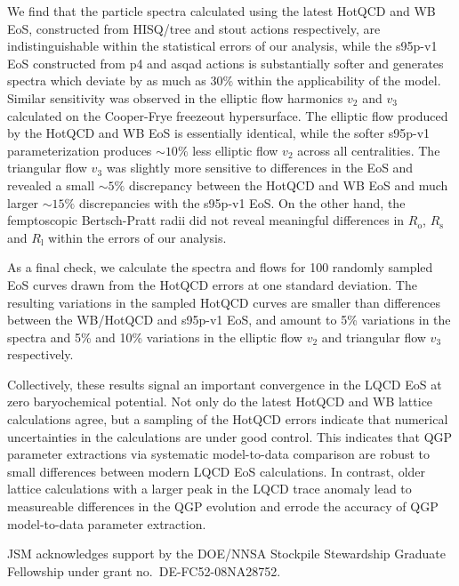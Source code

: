 \documentclass[aps,prc,reprint,amsmath,nofootinbib,superscriptaddress]{revtex4-1}
\begin{document}
We find that the particle spectra calculated using the latest HotQCD and WB EoS, constructed from HISQ/tree and stout actions respectively, are indistinguishable within the statistical errors of our analysis, while the s95p-v1 EoS constructed from p4 and asqad actions is substantially softer and generates spectra which deviate by as much as $30\%$ within the applicability of the model. 
Similar sensitivity was observed in the elliptic flow harmonics $v_2$ and $v_3$ calculated on the Cooper-Frye freezeout hypersurface. The elliptic flow produced by the HotQCD and WB EoS is essentially identical, while the softer s95p-v1 parameterization produces ${\sim}10\%$ less elliptic flow $v_2$ across all centralities. The triangular flow $v_3$ was slightly more sensitive to differences in the EoS and revealed a small ${\sim} 5\%$ discrepancy between the HotQCD and WB EoS and much larger ${\sim}15\%$ discrepancies with the s95p-v1 EoS. 
On the other hand, the femptoscopic Bertsch-Pratt radii did not reveal meaningful differences in $R_\text{o}$, $R_\text{s}$ and $R_\text{l}$ within the errors of our analysis. 

As a final check, we calculate the spectra and flows for 100 randomly sampled EoS curves drawn from the HotQCD errors at one standard deviation. The resulting variations in the sampled HotQCD curves are smaller than differences between the WB/HotQCD and s95p-v1 EoS, and amount to 
5\% variations in the spectra and 5\% and 10\% variations in the elliptic flow $v_2$ and triangular flow $v_3$ respectively. 

Collectively, these results signal an important convergence in the LQCD EoS at zero baryochemical potential. Not only do the latest HotQCD and WB lattice calculations agree, but a sampling of the HotQCD errors indicate that numerical uncertainties in the calculations are under
good control. This indicates that QGP parameter extractions via systematic model-to-data comparison are robust to small differences between modern LQCD EoS calculations. In contrast, older lattice calculations with a larger peak in the LQCD trace anomaly lead to measureable differences in the QGP evolution and errode the accuracy of QGP model-to-data parameter extraction.

\begin{acknowledgments}
 JSM acknowledges support by the DOE/NNSA Stockpile Stewardship Graduate Fellowship under grant no.~DE-FC52-08NA28752.
\end{acknowledgments}


\end{document}
